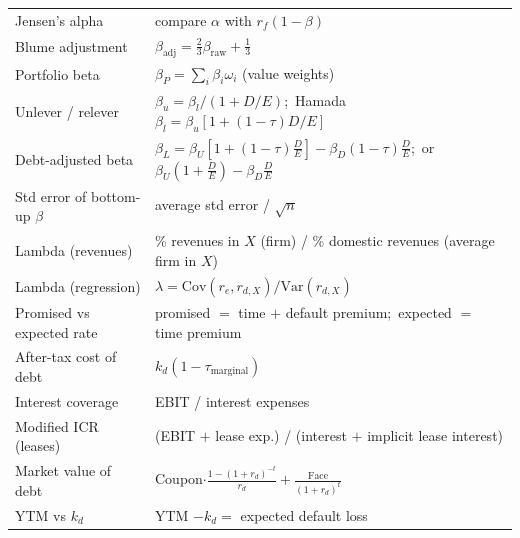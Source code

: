 \begin{center}
\begin{longtable}{@{}p{4.8cm}p{10.2cm}@{}}
Jensen's alpha & compare $\alpha$ with $r_f(1-\beta)$\\
Blume adjustment & $\beta_{\text{adj}}=\frac23\beta_{\text{raw}}+\frac13$\\
Portfolio beta & $\beta_P=\sum_i\beta_i\omega_i$ (value weights)\\
Unlever / relever & $\beta_u=\beta_l/(1+D/E)$;\ Hamada $\beta_l=\beta_u[1+(1-\tau)D/E]$\\
Debt-adjusted beta & $\beta_L=\beta_U[1+(1-\tau)\frac{D}{E}]-\beta_D(1-\tau)\frac{D}{E}$;\ or $\beta_U(1+\frac{D}{E})-\beta_D\frac{D}{E}$\\
Std error of bottom-up $\beta$ & average std error / $\sqrt{n}$\\
Lambda (revenues) & \% revenues in $X$ (firm) / \% domestic revenues (average firm in $X$)\\
Lambda (regression) & $\lambda=\text{Cov}(r_e,r_{d,X})/\text{Var}(r_{d,X})$\\
Promised vs expected rate & promised $=$ time $+$ default premium;\ expected $=$ time premium\\
After-tax cost of debt & $k_d(1-\tau_{\text{marginal}})$\\
Interest coverage & EBIT / interest expenses\\
Modified ICR (leases) & (EBIT $+$ lease exp.) / (interest $+$ implicit lease interest)\\
Market value of debt & Coupon$\cdot\frac{1-(1+r_d)^{-t}}{r_d}+\frac{\text{Face}}{(1+r_d)^t}$\\
YTM vs $k_d$ & YTM $-k_d=$ expected default loss\\
\bottomrule
\end{longtable}
\end{center}

